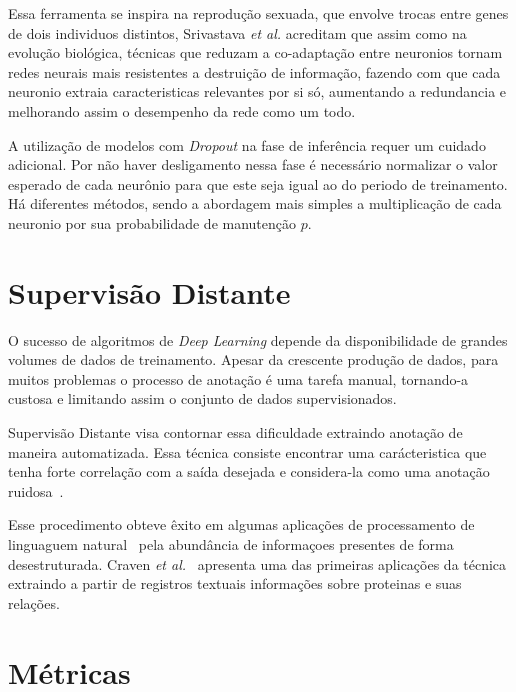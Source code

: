 Essa ferramenta se inspira na reprodução sexuada, que envolve trocas entre genes de dois individuos distintos, Srivastava \textit{et al.} acreditam que assim como na evolução biológica, técnicas que reduzam a co-adaptação entre neuronios tornam redes neurais mais resistentes a destruição de informação, fazendo com que cada neuronio extraia caracteristicas relevantes por si só, aumentando a redundancia e melhorando assim o desempenho da rede como um todo.

A utilização de modelos com \textit{Dropout} na fase de inferência requer um cuidado adicional. Por não haver desligamento nessa fase é necessário normalizar o valor esperado de cada neurônio para que este seja igual ao do periodo de treinamento. Há diferentes métodos, sendo a abordagem mais simples a multiplicação de cada neuronio por sua probabilidade de manutenção $p$.

\section{Supervisão Distante} \label{sec:distant_supervision}

O sucesso de algoritmos de \textit{Deep Learning} depende da disponibilidade de grandes volumes de dados de treinamento. Apesar da crescente produção de dados, para muitos problemas o processo de anotação é uma tarefa manual, tornando-a custosa e limitando assim o conjunto de dados supervisionados.

Supervisão Distante visa contornar essa dificuldade extraindo anotação de maneira automatizada. Essa técnica consiste encontrar uma carácteristica que tenha forte correlação com a saída desejada e considera-la como uma anotação ruidosa~\cite{go09}.

Esse procedimento obteve êxito em algumas aplicações de processamento de linguaguem natural~\cite{craven99}\cite{go09} pela abundância de informaçoes presentes de forma desestruturada. Craven \textit{et al.}~\cite{craven99} apresenta uma das primeiras aplicações da técnica extraindo a partir de registros textuais informações sobre proteinas e suas relações.


\section{Métricas} \label{sec:metrics}
